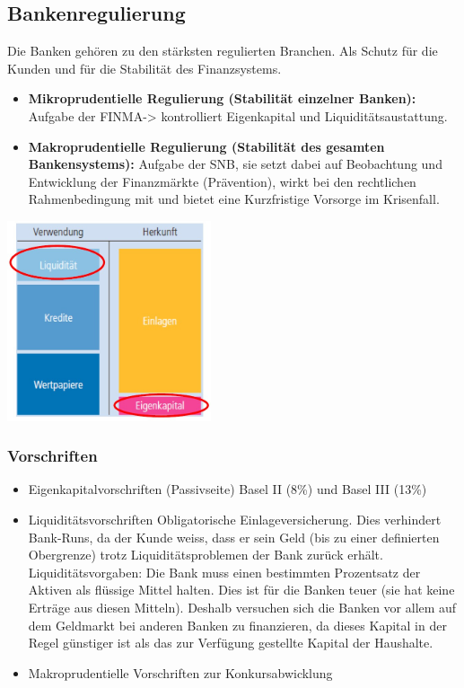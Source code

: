 \subsection{Bankenregulierung}
Die Banken gehören zu den stärksten regulierten Branchen. Als Schutz für die Kunden und für die Stabilität des Finanzsystems.\\
\begin{minipage}{13cm}
	\begin{itemize}
		\item \textbf{Mikroprudentielle Regulierung (Stabilität einzelner Banken): } Aufgabe der FINMA-> kontrolliert Eigenkapital und Liquiditätsaustattung.
		\item \textbf{Makroprudentielle Regulierung (Stabilität des gesamten Bankensystems): }Aufgabe der SNB, sie setzt dabei auf Beobachtung und Entwicklung der Finanzmärkte (Prävention), wirkt bei den rechtlichen Rahmenbedingung mit und bietet eine Kurzfristige Vorsorge im Krisenfall.
	\end{itemize}
\end{minipage}
\begin{minipage}{6cm}
	\includegraphics[width=6cm]{images/banken2.jpg}
\end{minipage}
\clearpage
\pagebreak
\subsubsection{Vorschriften}
\begin{itemize}
	\item Eigenkapitalvorschriften (Passivseite)
	\subitem Basel II (8\%) und Basel III (13\%)
	\item Liquiditätsvorschriften
	\subitem Obligatorische Einlageversicherung. Dies verhindert Bank-Runs, da der Kunde weiss, dass er sein Geld (bis zu einer definierten Obergrenze) trotz Liquiditätsproblemen der Bank zurück erhält.
	\subitem Liquiditätsvorgaben: Die Bank muss einen bestimmten Prozentsatz der Aktiven als flüssige Mittel
	halten. Dies ist für die Banken teuer (sie hat keine Erträge aus diesen Mitteln). Deshalb versuchen sich die Banken vor allem auf dem Geldmarkt bei anderen Banken zu finanzieren, da dieses Kapital in der Regel günstiger ist als das zur Verfügung gestellte Kapital der Haushalte.
	\item Makroprudentielle Vorschriften zur Konkursabwicklung
\end{itemize}
